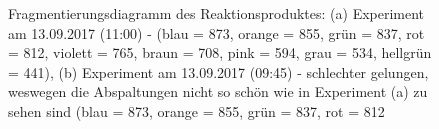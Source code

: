 \begin{figure}[htbp]
  \caption{Fragmentierungsdiagramm des Reaktionsproduktes: (a) Experiment am 13.09.2017 (11:00) - (blau = 873, orange = 855, grün = 837, rot = 812, violett = 765, braun = 708, pink = 594, grau = 534, hellgrün = 441), (b) Experiment am 13.09.2017 (09:45) - schlechter gelungen, weswegen die Abspaltungen nicht so schön wie in Experiment (a) zu sehen sind (blau = 873, orange = 855, grün = 837, rot = 812}
\end{figure}